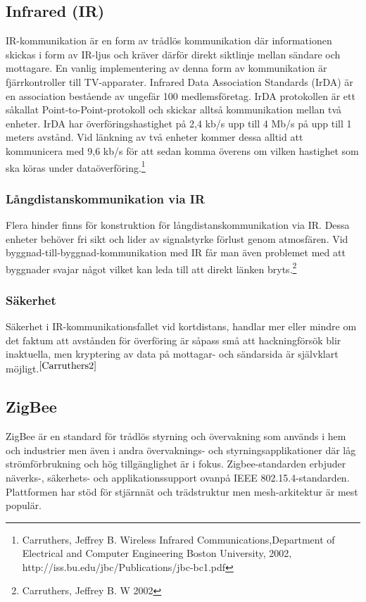\documentclass[a4paper,12pt,fleqn]{article}
\begin{document}
\subsection{Infrared (IR)}
IR-kommunikation är en form av trådlös kommunikation där informationen skickas i form av IR-ljus och kräver därför direkt siktlinje mellan sändare och mottagare. En vanlig implementering av denna form av kommunikation är fjärrkontroller till TV-apparater.
Infrared Data Association Standards (IrDA) är en association bestående av ungefär 100 medlemsföretag. IrDA protokollen är ett såkallat Point-to-Point-protokoll och skickar alltså kommunikation mellan två enheter. IrDA har överföringshastighet på 2,4 kb/s upp till 4 Mb/s på upp till 1 meters avstånd. Vid länkning av två enheter kommer dessa alltid att kommunicera med 9,6 kb/s för att sedan komma överens om vilken hastighet som ska köras under dataöverföring.\footnote{\label{Carruthers}Carruthers, Jeffrey B. Wireless Infrared Communications,Department of Electrical and Computer Engineering
Boston University, 2002, http://iss.bu.edu/jbc/Publications/jbc-bc1.pdf}  
\newpage
\subsubsection{Långdistanskommunikation via IR}
Flera hinder finns för konstruktion för långdistanskommunikation via IR. Dessa enheter behöver fri sikt och lider av signalstyrke förlust genom atmosfären. Vid byggnad-till-byggnad-kommunikation med IR får man även problemet med att byggnader svajar något vilket kan leda till att direkt länken bryts.\footnote{\label{Carruthers2}Carruthers, Jeffrey B. W 2002}

\subsubsection{Säkerhet}
Säkerhet i IR-kommunikationsfallet vid kortdistans, handlar mer eller mindre om det faktum att avstånden för överföring är såpass små att hackningförsök blir inaktuella, men kryptering av data på mottagar- och sändarsida är självklart möjligt.$^{\ref{Carruthers2}}$

\subsection{ZigBee}
ZigBee är en standard för trådlös styrning och övervakning som används i hem och industrier men även i andra övervaknings- och styrningsapplikationer där låg strömförbrukning och hög tillgänglighet är i fokus. Zigbee-standarden erbjuder näverks-, säkerhets- och applikationssupport ovanpå IEEE 802.15.4-standarden. Plattformen har stöd för stjärnnät och trädstruktur men mesh-arkitektur är mest populär.
\end{document}
